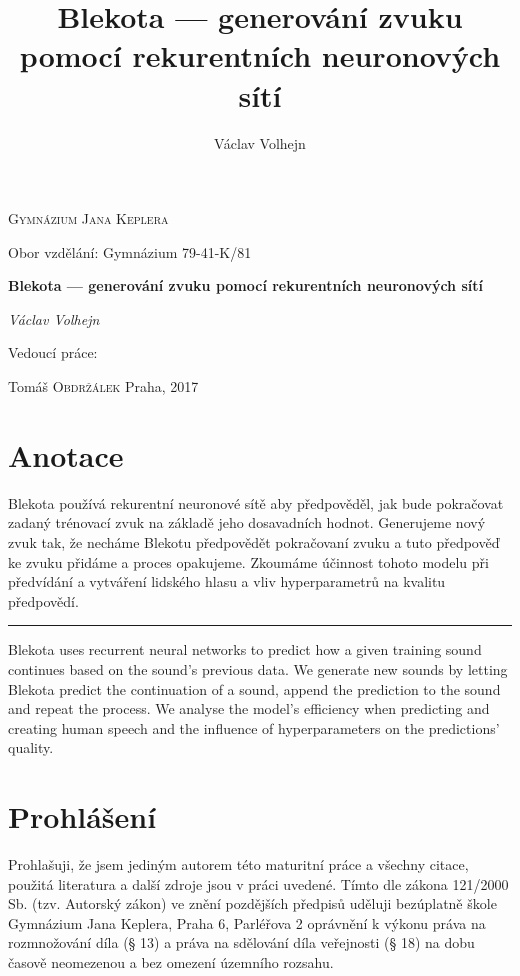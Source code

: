 \documentclass[a4]{article}
\begin{document}
\title{Blekota --- generování zvuku pomocí rekurentních neuronových sítí}
\author{Václav Volhejn}

\begin{titlepage}
\centering
{\scshape\Large Gymnázium Jana Keplera \par}
{Obor vzdělání: Gymnázium 79-41-K/81 \par}
\vspace{1.5cm}
{\huge\bfseries Blekota --- generování zvuku pomocí rekurentních neuronových sítí \par}
\vspace{2cm}
{\Large\itshape Václav Volhejn \par}
\vfill
Vedoucí práce: \par
Tomáš \textsc{Obdržálek}
\vfill
{\large Praha, 2017} %
\end{titlepage}

\tableofcontents
\section{Anotace}
Blekota používá rekurentní neuronové sítě aby předpověděl, jak bude pokračovat zadaný trénovací zvuk na základě jeho dosavadních hodnot. Generujeme nový zvuk tak, že necháme Blekotu předpovědět pokračovaní zvuku a tuto předpověď ke zvuku přidáme a proces opakujeme. Zkoumáme účinnost tohoto modelu při předvídání a vytváření lidského hlasu a vliv hyperparametrů na kvalitu předpovědí.
\noindent\rule[0.5ex]{\linewidth}{0.8pt}
Blekota uses recurrent neural networks to predict how a given training sound continues based on the sound's previous data. We generate new sounds by letting Blekota predict the continuation of a sound, append the prediction to the sound and repeat the process. We analyse the model's efficiency when predicting and creating human speech and the influence of hyperparameters on the predictions' quality.
\section{Prohlášení}
Prohlašuji, že jsem jediným autorem této maturitní práce a všechny citace, použitá literatura a další zdroje jsou v práci uvedené. Tímto dle zákona 121/2000 Sb. (tzv. Autorský zákon) ve znění pozdějších předpisů uděluji bezúplatně škole Gymnázium Jana Keplera, Praha 6, Parléřova 2 oprávnění k výkonu práva na rozmnožování díla (§ 13) a práva na sdělování díla veřejnosti (§ 18) na dobu časově neomezenou a bez omezení územního rozsahu.

\vfill
\end{document}
